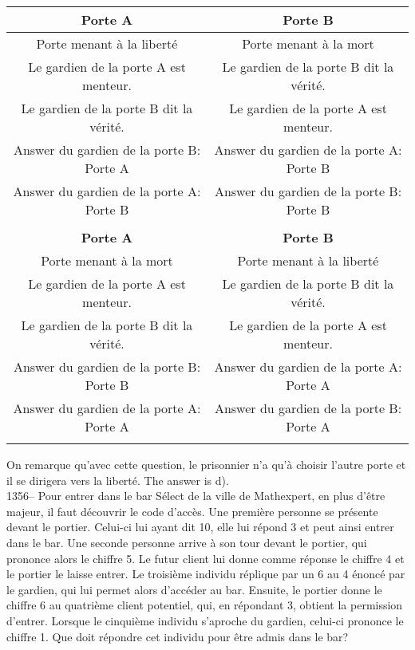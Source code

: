﻿\documentclass[letterpaper, 12pt]{article}
\begin{document}
\begin{tabular}{|c|c|} \hline
{\bf Porte A      }          & {\bf Porte B}  \\ \hline \hline

Porte menant \`a la libert\'e                  &  Porte menant \`a la mort
\\
\hline Le gardien de la porte A est menteur. & Le gardien de la porte B dit
la v\'erit\'e. \\
\hline
Le gardien de la porte B dit la v\'erit\'e. &  Le gardien de la porte A est
menteur. \\
\hline Answer du gardien de la porte B: Porte A & Answer du gardien de
la porte A: Porte B\\
\hline Answer du gardien de la porte A: Porte B & Answer du
gardien de la porte B: Porte B\\ \hline


\multicolumn{2}{c}{}\\
\hline
{\bf Porte A}                & {\bf Porte B}  \\ \hline \hline

Porte menant \`a la mort                 & Porte menant \`a la libert\'e \\
\hline
Le gardien de la porte A est menteur.      & Le gardien de la porte
B
dit la v\'erit\'e. \\
\hline  Le gardien de la porte B dit la v\'erit\'e. & Le gardien de
la porte A est menteur.
\\ \hline Answer du gardien de la porte B: Porte B & Answer du gardien
de la porte A: Porte
A\\ \hline Answer du gardien de la porte A: Porte A & Answer
du gardien de la porte B: Porte A \\ \hline
\multicolumn{2}{c}{}\\
\end{tabular}


On remarque qu'avec cette question, le prisonnier n'a qu'\`a choisir l'autre
porte et il se dirigera vers la libert\'e.  The answer is d).\\

1356--  Pour entrer dans le bar S\'elect de la ville de Mathexpert, en plus
d'\^etre majeur, il faut d\'ecouvrir le code d'acc\`es.  Une premi\`ere
personne se pr\'esente devant le portier.  Celui-ci lui ayant dit 10, elle
lui r\'epond 3 et peut ainsi entrer dans le bar.  Une seconde personne
arrive \`a son tour devant le portier, qui prononce alors le chiffre 5. Le
futur client lui donne comme r\'eponse le chiffre 4 et le portier le laisse
entrer.  Le troisi\`eme individu r\'eplique par un 6 au 4 \'enonc\'e par le
gardien, qui lui permet alors d'acc\'eder au bar. Ensuite, le portier donne
le chiffre 6 au quatri\`eme client potentiel, qui, en r\'epondant 3, obtient
la permission d'entrer. Lorsque le cinqui\`eme individu s'aproche du
gardien, celui-ci prononce le chiffre 1.  Que doit r\'epondre cet individu
pour \^etre admis dans le bar?\\
\end{document}
